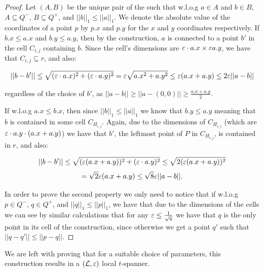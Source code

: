 \documentclass[12pt]{article}%
\begin{document}
\begin{proof}
    Let $(A,B)$ be the unique pair of the \QSPD such that w.l.o.g
    $a\in A$ and $b\in B$, $A\subseteq Q^-$, $B\subseteq Q^+$, and
    $||b||_{1} \leq ||a||_{1}$. We denote the absolute value of the
    coordinates of a point $p$ by $p.x$ and $p.y$ for the $x$ and $y$
    coordinates respectively. If $b.x \leq a.x$ and $b.y \leq a.y$,
    then by the construction, $a$ is connected to a point $b'$ in the
    cell $C_{i,j}$ containing $b$. Since the cell's dimensions are
    $\varepsilon\cdot a.x \times \varepsilon a.y$, we have that
    $C_{i,j}\subseteq r$, and also:
	
	\begin{equation}
            ||b-b'||\leq \sqrt{(\varepsilon\cdot a.x)^2+(\varepsilon\cdot
               a.y)^2}=\varepsilon\sqrt{a.x^2+a.y^2}\leq \varepsilon(a.x+a.y) \leq
            2\varepsilon||a-b||
        \end{equation}
	
	regardless of the choice of $b'$, as
        $||a-b||\geq||a-(0,0)||\geq \frac{a.x+a.y}{2}$.
	
	If w.l.o.g $a.x\leq b.x$, then since $||b||_{1} \leq
        ||a||_{1}$ we know that $b.y \leq a.y$ meaning that $b$ is
        contained in some cell $C_{H_{i,j}}$. Again, due to the
        dimensions of $C_{H_{i,j}}$ (which are
        $\eps\cdot a.y \time \eps\cdot(a.x+a.y)$) we have that $b'$,
        the leftmost point of $P$ in $C_{H_{i,j}}$, is contained in
        $r$, and also:
	
	\begin{equation}
            ||b-b'||\leq \sqrt{(\varepsilon (a.x+a.y))^2+(\varepsilon\cdot
               a.y)^2}\leq \sqrt{2(\varepsilon (a.x+a.y))^2}
        \end{equation}
	\begin{equation}
            =\sqrt{2}\varepsilon(a.x+a.y) \leq \sqrt{8}\varepsilon||a-b||.
        \end{equation}
	
	In order to prove the second property we only need to notice
        that if w.l.o.g $p\in Q^-$, $q\in Q^+$, and
        $||q||_1\leq ||p||_1$, we have that due to the dimensions of
        the cells we can see by similar calculations that for any
        $\varepsilon\leq \frac{1}{\sqrt{8}}$ we have that $q$ is the only
        point in its cell of the construction, since otherwise we get
        a point $q'$ such that $||q-q'||\leq ||p-q||$.
	
    \end{proof}

    We are left with proving that for a suitable choice of parameters,
    this construction results in a $(\mathcal{L},\varepsilon)$ local $t$-spanner.
\end{document}
